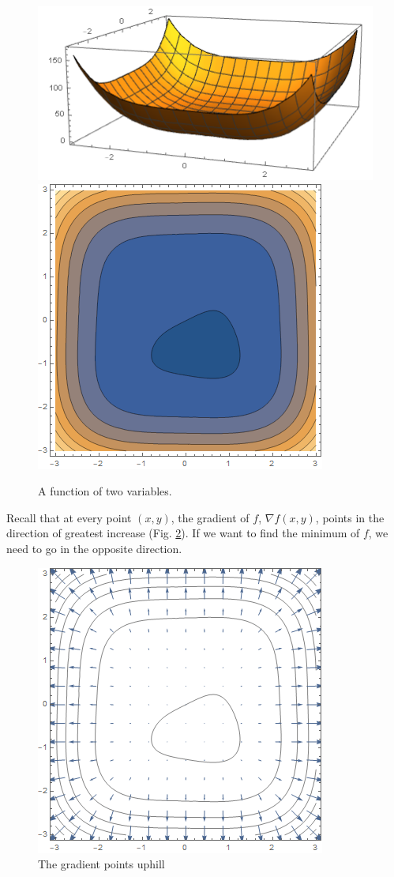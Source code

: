 \documentclass[
]{book}
\theoremstyle{definition}
\theoremstyle{definition}
\theoremstyle{definition}
\theoremstyle{definition}
\theoremstyle{remark}
\begin{document}
\begin{figure}

{\centering \includegraphics[width=0.4\linewidth]{images/gd8} \includegraphics[width=0.4\linewidth]{images/gd9} 

}

\caption{A function of two variables.}\label{fig:GD7}
\end{figure}

Recall that at every point \((x,y)\), the gradient of \(f\), \(\nabla f(x,y)\), points in the direction of greatest increase (Fig. \ref{fig:GD8}). If we want to find the minimum of \(f\), we need to go in the opposite direction.

\begin{figure}

{\centering \includegraphics[width=0.5\linewidth]{images/gd10} 

}

\caption{The gradient points uphill}\label{fig:GD8}
\end{figure}
\end{document}
